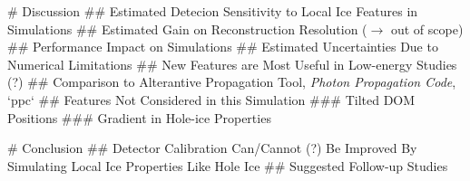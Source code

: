 # Discussion
## Estimated Detecion Sensitivity to Local Ice Features in Simulations
## Estimated Gain on Reconstruction Resolution ($\rightarrow$ out of scope)
## Performance Impact on Simulations
## Estimated Uncertainties Due to Numerical Limitations
## New Features are Most Useful in Low-energy Studies (?)
## Comparison to Alterantive Propagation Tool, \textit{Photon Propagation Code}, `ppc`
## Features Not Considered in this Simulation
### Tilted DOM Positions
### Gradient in Hole-ice Properties

# Conclusion
## Detector Calibration Can/Cannot (?) Be Improved By Simulating Local Ice Properties Like Hole Ice
## Suggested Follow-up Studies
